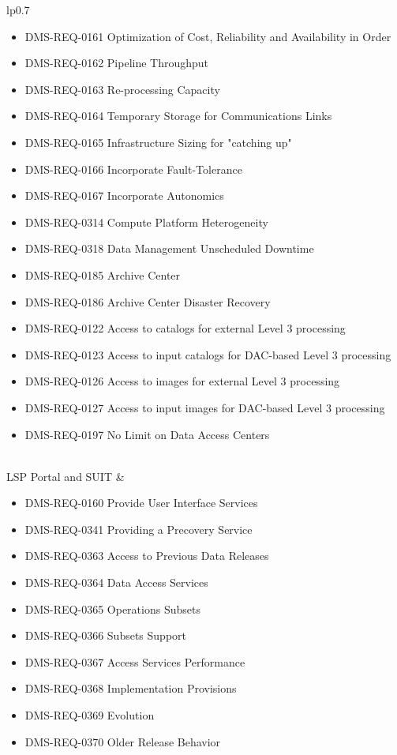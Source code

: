 \begin{xtabular}{lp{0.7\textwidth}}
\begin{itemize}
\item DMS-REQ-0161 Optimization of Cost, Reliability and Availability in Order
\item DMS-REQ-0162 Pipeline Throughput
\item DMS-REQ-0163 Re-processing Capacity
\item DMS-REQ-0164 Temporary Storage for Communications Links
\item DMS-REQ-0165 Infrastructure Sizing for "catching up"
\item DMS-REQ-0166 Incorporate Fault-Tolerance
\item DMS-REQ-0167 Incorporate Autonomics
\item DMS-REQ-0314 Compute Platform Heterogeneity
\item DMS-REQ-0318 Data Management Unscheduled Downtime
\item DMS-REQ-0185 Archive Center
\item DMS-REQ-0186 Archive Center Disaster Recovery
\item DMS-REQ-0122 Access to catalogs for external Level 3 processing
\item DMS-REQ-0123 Access to input catalogs for DAC-based Level 3 processing
\item DMS-REQ-0126 Access to images for external Level 3 processing
\item DMS-REQ-0127 Access to input images for DAC-based Level 3 processing
\item DMS-REQ-0197 No Limit on Data Access Centers
\end{itemize} \\ \hline
LSP Portal and SUIT &
\begin{itemize}DMS-REQ-0119 DAC resource allocation for Level 3 processing
\item DMS-REQ-0160 Provide User Interface Services
\item DMS-REQ-0341 Providing a Precovery Service
\item DMS-REQ-0363 Access to Previous Data Releases
\item DMS-REQ-0364 Data Access Services
\item DMS-REQ-0365 Operations Subsets
\item DMS-REQ-0366 Subsets Support
\item DMS-REQ-0367 Access Services Performance
\item DMS-REQ-0368 Implementation Provisions
\item DMS-REQ-0369 Evolution
\item DMS-REQ-0370 Older Release Behavior

\end{itemize}
\end{xtabular}
